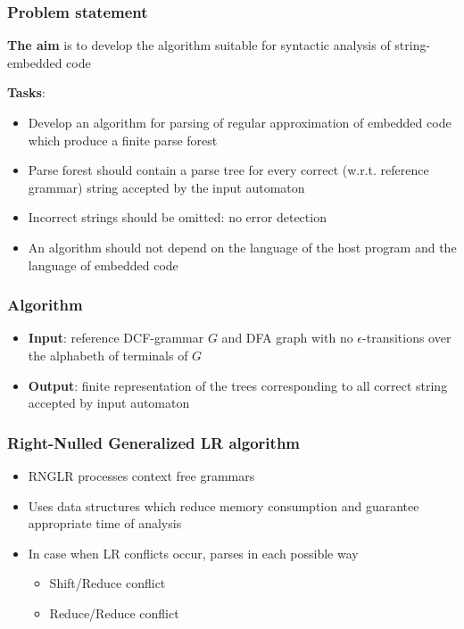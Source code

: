 \documentclass{beamer}
\begin{document}
\begin{frame}
  \transwipe[direction=90]
  \frametitle{Problem statement}
  \textbf{The aim} is to develop the algorithm suitable for syntactic analysis of string-embedded code  
  
  \textbf{Tasks}:
  \begin{itemize}
    \item Develop an algorithm for parsing of regular approximation of embedded 
code which produce a finite parse forest
    \item Parse forest should contain a parse tree for every correct (w.r.t. 
reference grammar) string accepted by the input automaton
    \item Incorrect strings should be omitted: no error detection
    \item An algorithm should not depend on the language of the host program 
and the language of embedded code
  \end{itemize}
\end{frame}
            
\begin{frame}
  \transwipe[direction=90]
  \frametitle{Algorithm}
  \begin{itemize}
    \item \textbf{Input}: reference DCF-grammar $G$ and DFA graph with no 
$\epsilon$-transitions over the alphabeth of terminals of $G$
    \item \textbf{Output}: finite representation of the trees corresponding to 
all correct string accepted by input automaton
  \end{itemize}
\end{frame}

\begin{frame}
  \transwipe[direction=90]
  \frametitle{Right-Nulled Generalized LR algorithm}
  \begin{itemize}
    \item RNGLR processes context free grammars
    \item Uses data structures which reduce memory consumption and guarantee 
appropriate time of analysis
    \item In case when LR conflicts occur, parses in each possible way
    \begin{itemize}
      \item Shift/Reduce conflict
      \item Reduce/Reduce conflict
    \end{itemize}
  \end{itemize}
\end{frame}
\end{document}

